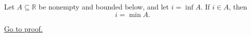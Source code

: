 \begin{proposition}
\label{prop:infimum-in-the-set-is-the-minimum}
Let $A\subseteq\mathbb{R}$ be nonempty and bounded below, and let
$i=\inf A$. If $i\in A$, then
\[
  i=\min A.
\]

\hyperref[prf:infimum-in-the-set-is-the-minimum]{Go to proof.}
\end{proposition}